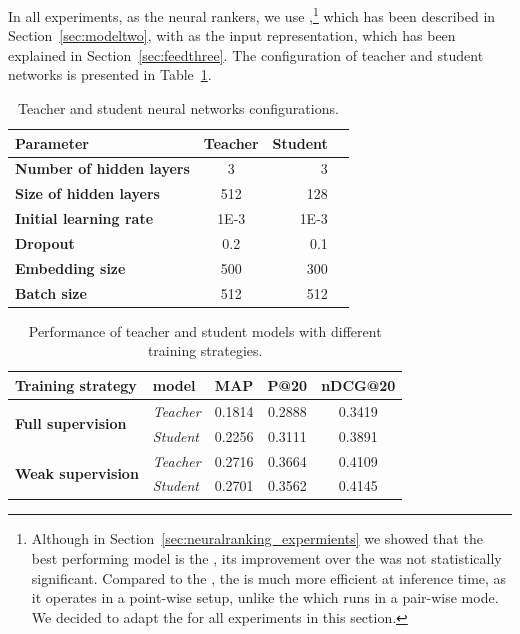 In all experiments, as the neural rankers, we use \modeltwo,\footnote{Although in Section~\ref{sec:neuralranking_expermients} we showed that the best performing model is the \modelthree, its improvement over the \modeltwo was not statistically significant. Compared to the \modelthree, the \modeltwo is much more efficient at inference time, as it operates in a point-wise setup, unlike the \modelthree which runs in a pair-wise mode. We decided to adapt the \modeltwo for all experiments in this section.} which has been described in Section~\ref{sec:modeltwo}, with \feedthree as the input representation, which has been explained in Section~\ref{sec:feedthree}.
The configuration of teacher and student networks is presented in Table~\ref{tbl:cfg}.
\begin{table}[t]
\centering
\caption{Teacher and student neural networks configurations.}
\begin{tabular}{lcrr} 
\toprule
\bf Parameter & \bf Teacher & \bf Student  \\
\midrule
\textbf{Number of hidden layers} & 3 & 3  \\
\textbf{Size of hidden layers} & 512 & 128 \\
\textbf{Initial learning rate} & 1E-3 & 1E-3 \\
\textbf{Dropout} & 0.2 & 0.1 \\
\textbf{Embedding size} & 500 & 300 \\
\textbf{Batch size} & 512 & 512  \\
\bottomrule
\end{tabular}
\label{tbl:cfg}
\end{table}

\begin{table}[t]
\centering
\caption{\label{tbl_res1}Performance of teacher and student models with different training strategies.}
\vspace{5pt}
\begin{adjustbox}{max width=\textwidth}
\begin{tabular}{l l c c c}
\toprule
\bf Training strategy & \bf model & \textbf{MAP} & \textbf{P@20} & \textbf{nDCG@20} 
\\ \midrule
\multirow{2}{*}{{\textbf{Full supervision}}} & {\textit{Teacher}} 
& 0.1814 & 0.2888 & 0.3419 
\\
& {\textit{Student}} 
& 0.2256 & 0.3111 & 0.3891 
\\ \midrule
\multirow{2}{*}{{\textbf{Weak supervision}}} & {\textit{Teacher}} 
& 0.2716 & 0.3664 & 0.4109 
\\ 
& {\textit{Student}} 
& 0.2701 & 0.3562 & 0.4145 
\\ \bottomrule
\end{tabular}
\end{adjustbox}
\end{table}

